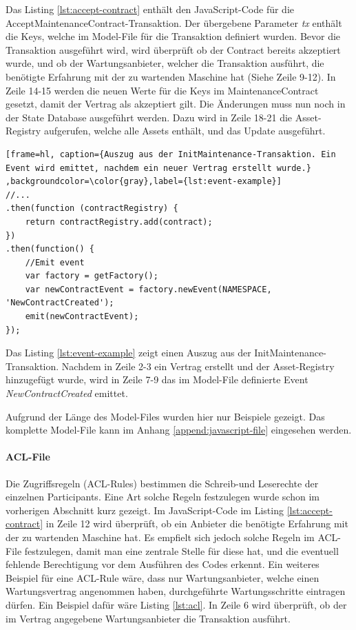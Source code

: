 Das Listing \ref{lst:accept-contract} enthält den JavaScript-Code für die AcceptMaintenanceContract-Transaktion. Der übergebene Parameter \textit{tx} enthält die Keys, welche im Model-File für die Transaktion definiert wurden. Bevor die Transaktion ausgeführt wird, wird überprüft ob der Contract bereits akzeptiert wurde, und ob der Wartungsanbieter, welcher die Transaktion ausführt, die benötigte Erfahrung mit der zu wartenden Maschine hat (Siehe Zeile 9-12). In Zeile 14-15 werden die neuen Werte für die Keys im MaintenanceContract gesetzt, damit der Vertrag als akzeptiert gilt. Die Änderungen muss nun noch in der State Database ausgeführt werden. Dazu wird in Zeile 18-21 die Asset-Registry aufgerufen, welche alle Assets enthält, und das Update ausgeführt.

\begin{lstfloat}
\begin{lstlisting}[frame=hl, caption={Auszug aus der InitMaintenance-Transaktion. Ein Event wird emittet, nachdem ein neuer Vertrag erstellt wurde.} ,backgroundcolor=\color{gray},label={lst:event-example}]
//...
.then(function (contractRegistry) {
    return contractRegistry.add(contract);
})
.then(function() {
    //Emit event
    var factory = getFactory();
    var newContractEvent = factory.newEvent(NAMESPACE, 'NewContractCreated');
    emit(newContractEvent);
});
\end{lstlisting} 
\end{lstfloat}

Das Listing \ref{lst:event-example} zeigt einen Auszug aus der InitMaintenance-Transaktion. Nachdem in Zeile 2-3 ein Vertrag erstellt und der Asset-Registry hinzugefügt wurde, wird in Zeile 7-9 das im Model-File definierte Event \textit{NewContractCreated} emittet.

Aufgrund der Länge des Model-Files wurden hier nur Beispiele gezeigt. Das komplette Model-File kann im Anhang \ref{append:javascript-file} eingesehen werden.

\paragraph{ACL-File}
Die Zugriffsregeln (ACL-Rules) bestimmen die Schreib-und Leserechte der einzelnen Participants. Eine Art solche Regeln festzulegen wurde schon im vorherigen Abschnitt kurz gezeigt. Im JavaScript-Code im Listing \ref{lst:accept-contract} in Zeile 12 wird überprüft, ob ein Anbieter die benötigte Erfahrung mit der zu wartenden Maschine hat. Es empfielt sich jedoch solche Regeln im ACL-File festzulegen, damit man eine zentrale Stelle für diese hat, und die eventuell fehlende Berechtigung vor dem Ausführen des Codes erkennt. Ein weiteres Beispiel für eine ACL-Rule wäre, dass nur Wartungsanbieter, welche einen Wartungsvertrag angenommen haben, durchgeführte Wartungsschritte eintragen dürfen. Ein Beispiel dafür wäre Listing \ref{lst:acl}. In Zeile 6 wird überprüft, ob der im Vertrag angegebene Wartungsanbieter die Transaktion ausführt.

